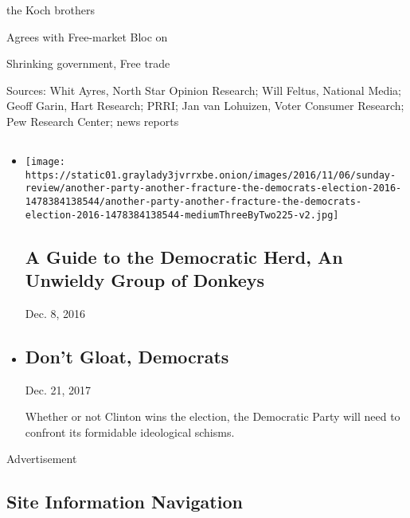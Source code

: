 the Koch brothers

Agrees with Free-market Bloc on

Shrinking government, Free trade

Sources: Whit Ayres, North Star Opinion Research; Will Feltus, National
Media; Geoff Garin, Hart Research; PRRI; Jan van Lohuizen, Voter
Consumer Research; Pew Research Center; news reports

\hypertarget{-1}{%
\subsection{}\label{-1}}

\begin{itemize}
\item
  \href{https://www.nytimes3xbfgragh.onion/interactive/2016/11/06/sunday-review/another-party-another-fracture-the-democrats-election-2016.html}{}

  \texttt{[image: https://static01.graylady3jvrrxbe.onion/images/2016/11/06/sunday-review/another-party-another-fracture-the-democrats-election-2016-1478384138544/another-party-another-fracture-the-democrats-election-2016-1478384138544-mediumThreeByTwo225-v2.jpg]}

  \hypertarget{a-guide-to-the-democratic-herd-an-unwieldy-group-of-donkeys}{%
  \subsection{A Guide to the Democratic Herd, An Unwieldy Group of
  Donkeys}\label{a-guide-to-the-democratic-herd-an-unwieldy-group-of-donkeys}}

  Dec. 8, 2016
\item
  \href{https://www.nytimes3xbfgragh.onion/2016/11/06/sunday-review/dont-gloat-democrats.html}{}

  \hypertarget{dont-gloat-democrats}{%
  \subsection{Don't Gloat, Democrats}\label{dont-gloat-democrats}}

  Dec. 21, 2017

  Whether or not Clinton wins the election, the Democratic Party will
  need to confront its formidable ideological schisms.
\end{itemize}

Advertisement

\hypertarget{site-information-navigation}{%
\subsection{Site Information
Navigation}\label{site-information-navigation}}

